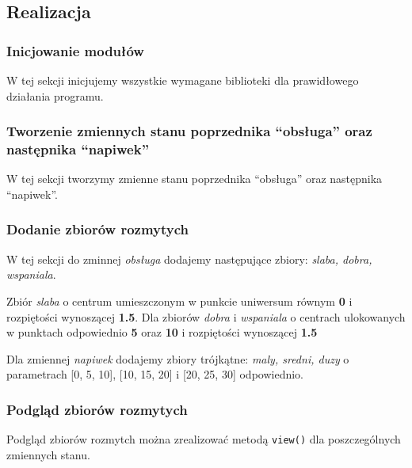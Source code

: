 \subsection{Realizacja}\label{subsec:realizacja}
\subsubsection{Inicjowanie modułów}\label{ssc:inicjowanie}

W tej sekcji inicjujemy wszystkie wymagane biblioteki dla prawidłowego działania programu.



\subsubsection{Tworzenie zmiennych stanu poprzednika ``obsługa'' oraz następnika ``napiwek''}\label{ssc:tworzenie}

W tej sekcji tworzymy zmienne stanu poprzednika ``obsługa'' oraz następnika ``napiwek''.



\subsubsection{Dodanie zbiorów rozmytych}\label{ssc:dodanie_zbiorow_rozmytych}
 
W tej sekcji do zminnej \emph{obsługa} dodajemy następujące zbiory: \emph{slaba, dobra, wspaniala}. 

Zbiór \emph{slaba} o centrum umieszczonym w punkcie uniwersum równym \textbf{0} i rozpiętości wynoszącej \textbf{1.5}. Dla zbiorów \emph{dobra} i \emph{wspaniala} o centrach ulokowanych w punktach odpowiednio \textbf{5} oraz \textbf{10} i rozpiętości wynoszącej \textbf{1.5}

Dla zmiennej \emph{napiwek} dodajemy zbiory trójkątne: \emph{maly, sredni, duzy} o parametrach [0, 5, 10], [10, 15, 20] i [20, 25, 30] odpowiednio.



\subsubsection{Podgląd zbiorów rozmytych}\label{ssc:podglad_zbiorow}

Podgląd zbiorów rozmytch można zrealizować metodą \verb|view()| dla poszczególnych zmiennych stanu.

